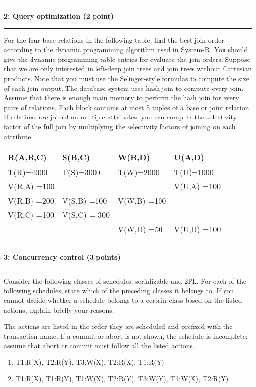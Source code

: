 \documentclass[11pt]{article}
\newcommand\question[2]{\vspace{.25in}\hrule\textbf{#1: #2}\vspace{.5em}\hrule\vspace{.10in}}
\begin{document}
\question{2}{Query optimization  (2 point)}
For the four base relations in the following table, 
find the best join order according to 
the dynamic programming algorithm used in System-R. 
You should give the dynamic programming table entries 
for evaluate the join orders.
Suppose that we are only interested in left-deep join trees and 
join trees without Cartesian products. 
Note that you must use the Selinger-style formulas to compute the size of each join output.
The database system uses hash join to compute every join.
Assume that there is enough main memory to perform the hash join for every pairs of relations.
Each block contains at most 5 tuples of a base or joint relation.
If relations are joined on multiple attributes, you can compute the selectivity factor of the full join by multiplying the 
selectivity factors of joining on each attribute.

		
\begin{tabular}{ |l| l | l|l|}
\hline
  R(A,B,C) & S(B,C) & W(B,D) & U(A,D) \\\hline
  T(R)=4000 & T(S)=3000& T(W)=2000 & T(U)=1000 \\\hline
  V(R,A) =100 &  & & V(U,A) =100\\
  V(R,B) =200 & V(S,B) =100& V(W,B) =100& \\
  V(R,C) =100 & V(S,C) = 300&&\\
  & & V(W,D) =50 & V(U,D) =100\\\hline
\end{tabular}





\question{3}{Concurrency control (3 points)}
Consider the following classes of schedules: serializable and 2PL. 
For each of the following schedules, state which of the preceding classes it belongs to. 
If you cannot decide whether a schedule belongs to a certain class based on the listed actions, explain briefly your reasons.

The actions are listed in the order they are scheduled and prefixed with the transaction name. 
If a commit or abort is not shown, the schedule is incomplete; assume that abort or commit must follow all the listed actions.


\begin{enumerate}
\item T1:R(X), T2:R(Y), T3:W(X), T2:R(X), T1:R(Y)
\item T1:R(X), T1:R(Y), T1:W(X), T2:R(Y), T3:W(Y), T1:W(X), T2:R(Y)
\end{enumerate}
\end{document}
